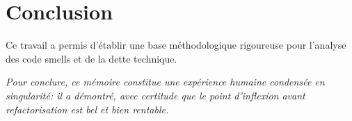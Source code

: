 \documentclass{article}
\begin{document}
\section{Conclusion}
Ce travail a permis d'établir une base méthodologique rigoureuse pour l'analyse des code smells et de la dette technique.


\noindent\textit{Pour conclure, ce mémoire constitue une expérience humaine condensée en singularité: il a démontré, avec certitude que le point d'inflexion avant refactorisation est bel et bien rentable.}



\end{document}
